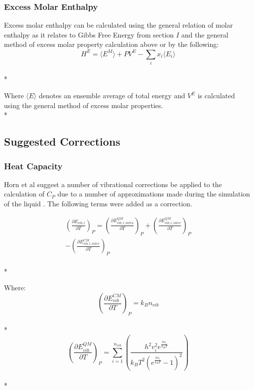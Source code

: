 \documentclass[9pt,bestpractices]{livecoms}
\begin{document}

\subsubsection{Excess Molar Enthalpy}
Excess molar enthalpy can be calculated using the general relation of molar enthalpy as it relates to Gibbs Free Energy from section $I$ and the general method of excess molar property calculation above or by the following\cite{hexcess}:
\begin{equation}H^E = \langle E^M \rangle + P V^E - \sum_{i} x_i \langle E_i \rangle\end{equation}\\*
 
Where $\langle E \rangle$ denotes an ensemble average of total energy and $V^E$ is calculated using the general method of excess molar properties.\\* 


\subsection{Suggested Corrections}
\subsubsection{Heat Capacity}
Horn et al suggest a number of vibrational corrections be applied to the calculation of $C_P$ due to a number of approximations made during the simulation of the liquid \cite{horn}. The following terms were added as a correction.

\begin{multline}
\left(\frac{\partial E_{vib,l}}{\partial T}\right)_{P} = \left(\frac{\partial E_{vib,l,intra}^{QM}}{\partial T}\right)_{P} + \left(\frac{\partial E_{vib,l,inter}^{QM}}{\partial T}\right)_{P} \\ - \left(\frac{\partial E_{vib,l,inter}^{CM}}{\partial T}\right)_{P}
\end{multline}\\*

Where:
\begin{equation}\left(\frac{\partial E_{vib}^{CM}}{\partial T}\right)_{P} = k_B n_{vib}\end{equation}\\*
\begin{equation}\left(\frac{\partial E_{vib}^{QM}}{\partial T}\right)_{P} = \sum_{i=1}^{n_{vib}} \left(\frac{h^2 v_{i}^2 e^{\frac{h v_{i}}{k_B T}}}{k_B T^2 \left(e^{\frac{h v_{i}}{k_B T}} - 1\right)^2}\right)\end{equation}\\*
\end{document}
